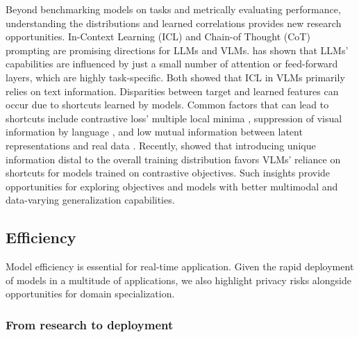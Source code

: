 Beyond benchmarking models on tasks and metrically evaluating performance, understanding the distributions and learned correlations provides new research opportunities. In-Context Learning (ICL)  and Chain-of Thought (CoT)  prompting are promising directions for LLMs and VLMs.  has shown that LLMs' capabilities are influenced by just a small number of attention or feed-forward layers, which are highly task-specific. Both  showed that ICL in VLMs primarily relies on text information. Disparities between target and learned features can occur due to shortcuts learned by models. Common factors that can lead to shortcuts include contrastive loss' multiple local minima , suppression of visual information by language , and low mutual information between latent representations and real data . Recently,  showed that introducing unique information distal to the overall training distribution favors VLMs' reliance on shortcuts for models trained on contrastive objectives. Such insights provide opportunities for exploring objectives and models with better multimodal and data-varying generalization capabilities.


\subsection{Efficiency}
\label{sec:directions::efficiency}

Model efficiency is essential for real-time application. Given the rapid deployment of models in a multitude of applications, we also highlight privacy risks alongside opportunities for domain specialization.  

\subsubsection{From research to deployment}
\label{sec:directions::efficiency:::deployment}


